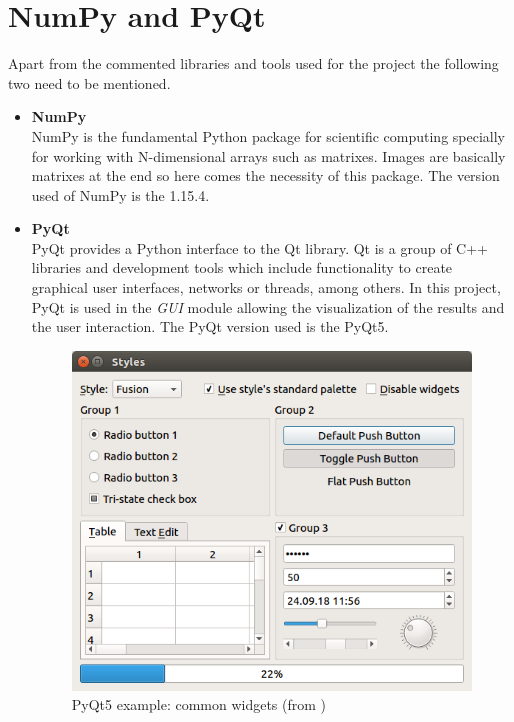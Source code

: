 \section{NumPy and PyQt}
Apart from the commented libraries and tools used for the project the following two need to be mentioned.
\begin{itemize}
\item \textbf{NumPy}\\
NumPy is the fundamental Python package for scientific computing specially for working with N-dimensional arrays such as matrixes. Images are basically matrixes at the end so here comes the necessity of this package. The version used of NumPy is the 1.15.4.
\item \textbf{PyQt}\\
PyQt provides a Python interface to the Qt library. Qt is a group of C++ libraries and development tools which include functionality to create graphical user interfaces, networks or threads, among others. In this project, PyQt is used in the \textit{GUI} module allowing the visualization of the results and the user interaction. The PyQt version used is the PyQt5.
\begin{figure}[H]
\begin{center}
\includegraphics[scale=0.5]{figures/pyqt.png}
\caption{PyQt5 example: common widgets (from \cite{pyqt})}
\label{fig:pyqt}
\end{center}
\end{figure}
\end{itemize}
